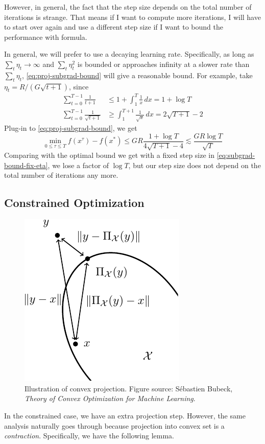 \documentclass{scrartcl}
\begin{document}
However, in general, the fact that the step size depends on the total number of iterations is
strange. That means if I want to compute more iterations, I will have to start over again and use a
different step size if I want to bound the performance with formula.

In general, we will prefer to use a decaying learning rate. Specifically, as long as
$\sum_t\eta_t\rightarrow \infty$ and $\sum_t\eta_t^2$ is bounded or approaches infinity at a slower
rate than $\sum_t\eta_t$, \eqref{eq:proj-subgrad-bound} will give a reasonable bound. For example,
take $\eta_t=R/(G\sqrt{t+1})$, since
\[
\begin{aligned}
  \sum_{t=0}^{T-1} \frac{1}{t+1} &\leq 1 + \int_1^{T} \frac{1}{x}\,dx = 1 + \log T \\
  \sum_{t=0}^{T-1} \frac{1}{\sqrt{t+1}} &\geq \int_1^{T+1}\frac{1} {\sqrt{x}}\,dx =
  2\sqrt{T+1}-2
\end{aligned}
\]
Plug-in to \eqref{eq:proj-subgrad-bound}, we get
\begin{equation}
  \min_{0\leq \tau \leq T} f(x^\tau) - f(x^*)
  \leq GR \frac{1+\log T}{4\sqrt{T+1}-4} \lesssim \frac
  {GR\log T}{\sqrt{T}}
\end{equation}
Comparing with the optimal bound we get with a fixed step size in \eqref{eq:subgrad-bound-fix-eta},
we lose a factor of $\log T$, but our step size does not depend on the total number of iterations any
more.

\subsection{Constrained Optimization}

\begin{figure}
\centering
\includegraphics[width=.8\linewidth]{figs/convex-projection}
\caption{Illustration of convex projection. Figure source: S{\'e}bastien Bubeck, \emph{Theory of
Convex Optimization for Machine Learning}.}
\end{figure}
In the constrained case, we have an extra projection step. However, the same analysis naturally goes
through because projection into convex set is a \emph{contraction}. Specifically, we have the
following lemma.
\end{document}
